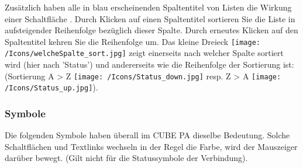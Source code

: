Zusätzlich haben alle in blau erscheinenden Spaltentitel von Listen die Wirkung einer Schaltfläche . Durch Klicken auf einen Spaltentitel sortieren Sie die
Liste in aufsteigender Reihenfolge bezüglich dieser Spalte. Durch erneutes Klicken auf den Spaltentitel kehren Sie die Reihenfolge um. Das kleine Dreieck \texttt{[image: /Icons/welcheSpalte\_sort.jpg]}  zeigt einerseits nach welcher Spalte sortiert wird (hier nach 'Status') und andererseits wie die Reihenfolge der Sortierung ist: (Sortierung A {\textgreater} Z \texttt{[image: /Icons/Status\_down.jpg]} resp. Z {\textgreater} A \texttt{[image: /Icons/Status\_up.jpg]}).

\pagebreak
\subsubsection{Symbole}
\label{bkm:Ref443039356}
Die folgenden Symbole haben überall im CUBE PA dieselbe Bedeutung. Solche Schaltflächen und Textlinks wechseln in der Regel die Farbe, wird der Mauszeiger darüber bewegt. (Gilt nicht für die Statussymbole der Verbindung). 

